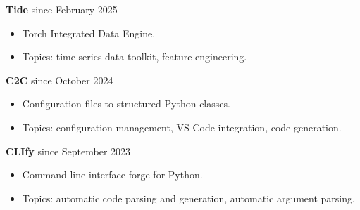 \documentclass{article}
\begin{document}
\noindent \textbf{Tide} \href{https://github.com/RobinU434/Tide}{\faGithubSquare}\hfill since February 2025 
\begin{itemize}[noitemsep,nolistsep,leftmargin=*]
    \item Torch Integrated Data Engine.
    \item Topics: time series data toolkit, feature engineering.\\
\end{itemize} 


\noindent \textbf{C2C} \href{https://github.com/RobinU434/Config2Class}{\faGithubSquare}\hfill since October 2024
\begin{itemize}[noitemsep,nolistsep,leftmargin=*]
    \item Configuration files to structured Python classes.
    \item Topics: configuration management, VS Code integration, code generation.\\
\end{itemize}
 


\noindent \textbf{CLIfy} \href{https://github.com/RobinU434/PyArgWriter}{\faGithubSquare}\hfill since September 2023
\begin{itemize}[noitemsep,nolistsep,leftmargin=*]
    \item Command line interface forge for Python.
    \item Topics: automatic code parsing and generation, automatic argument parsing.\\
\end{itemize}
\end{document}
